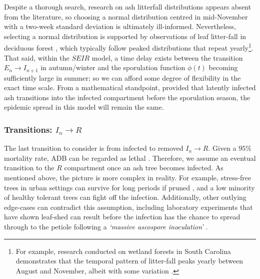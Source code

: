 Despite a thorough search, research on ash litterfall distributions appears absent from the literature, 
so choosing a normal distribution centred in mid-November with a two-week standard deviation is ultimately ill-informed. 
Nevertheless, selecting a normal distribution is supported by observations of leaf litter-fall in deciduous 
forest \cite{zhang2014seasonal, dixon1976analysis}, which typically follow peaked distributions that repeat yearly\footnote{
    For example, research conducted on wetland forests in South Carolina demonstrates that the temporal pattern of litter-fall
    peaks yearly between August and November, albeit with some variation \cite{shure1985litter}.}.
That said, within the $SEIR$ model, a time delay exists between the transition $E_n \rightarrow I_{n+1}$ in autumn/winter and the 
sporulation function $\phi(t)$ becoming sufficiently large in summer; so we can afford some degree of flexibility in the exact time scale.
From a mathematical standpoint, provided that latently infected ash transitions into the infected compartment before the sporulation season,
the epidemic spread in this model will remain the same.


\subsubsection{Transitions: $I_n\rightarrow R$}
\label{sec:I-to-R}
The last transition to consider is from infected to removed $I_{n}\rightarrow R$. 
Given a $95\%$ mortality rate, ADB can be regarded as lethal \cite{ash-dieback-costs}. 
Therefore, we assume an eventual transition to the $R$ compartment once an ash tree becomes infected.
As mentioned above, the picture is more complex in reality. 
For example, stress-free trees in urban settings can survive for long periods if pruned \cite{marciulyniene2017can}, and a low minority of healthy tolerant trees can fight off the infection.
Additionally, other outlying edge-cases can contradict this assumption, including
laboratory experiments that have shown leaf-shed can result before the infection has the chance to spread through to the petiole following a \textit{`massive ascospore inoculation'} \cite{https://doi.org/10.1111/mpp.12073}.

